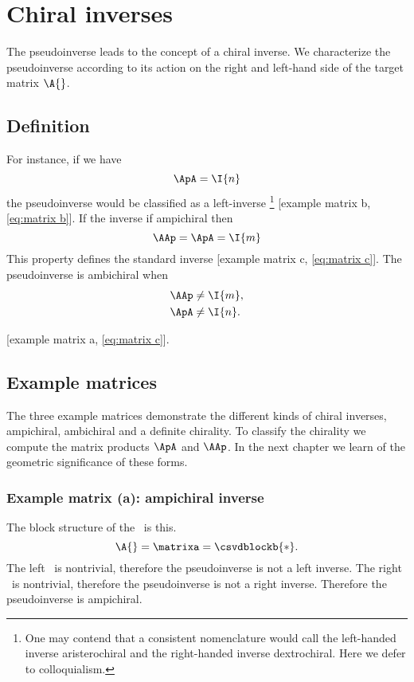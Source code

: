 \section{Chiral inverses}
The pseudoinverse leads to the concept of a chiral inverse. We characterize the pseudoinverse  according to its action on the right and left-hand side of the target matrix $\A{}$. 

\subsection{Definition}
For instance, if we have
\begin{equation}
  \ApA = \I{n}
\end{equation}
the pseudoinverse would be classified as a left-inverse
\footnote{One may contend that a consistent nomenclature would call the left-handed inverse aristerochiral and the right-handed inverse dextrochiral. Here we defer to colloquialism.}
 [example matrix b, \eqref{eq:matrix b}]. If the inverse if ampichiral then
\begin{equation}
  \AAp = \ApA = \I{m}
\end{equation}
This property defines the standard inverse [example matrix c, \eqref{eq:matrix c}]. The pseudoinverse is ambichiral when
\begin{equation}
  \begin{split}
    \AAp &\ne \I{m}, \\
    \ApA &\ne \I{n}.
  \end{split}
\end{equation}

[example matrix a, \eqref{eq:matrix c}].


\subsection{Example matrices}
The three example matrices demonstrate the different kinds of chiral inverses, ampichiral, ambichiral and a definite chirality. To classify the chirality we compute the matrix products $\ApA$ and $\AAp$. In the next chapter we learn of the geometric significance of these forms.

\subsubsection{Example matrix (a): ampichiral inverse}
The block structure of the \asvd \ is this.
\begin{equation}
  \A{} = \matrixa = \csvdblockb{*}.
\end{equation}
The left \ns \ is nontrivial, therefore the pseudoinverse is not a left inverse.
The right \ns \ is nontrivial, therefore the pseudoinverse is not a right inverse.
Therefore the pseudoinverse is ampichiral.

